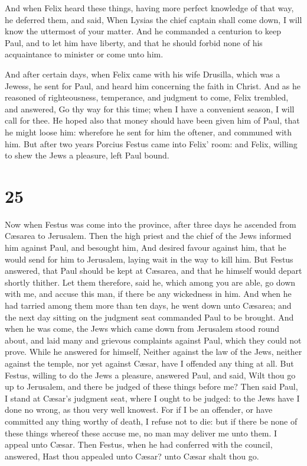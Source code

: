  And when Felix heard these things, having more perfect
knowledge of that way, he deferred them, and said, When Lysias the chief
captain shall come down, I will know the uttermost of your matter.
 And he commanded a centurion to keep Paul, and to let
him have liberty, and that he should forbid none of his acquaintance to
minister or come unto him.

 And after certain days, when Felix came with his wife
Drusilla, which was a Jewess, he sent for Paul, and heard him concerning
the faith in Christ.  And as he reasoned of
righteousness, temperance, and judgment to come, Felix trembled, and
answered, Go thy way for this time; when I have a convenient season, I
will call for thee.  He hoped also that money should have
been given him of Paul, that he might loose him: wherefore he sent for
him the oftener, and communed with him.  But after two
years Porcius Festus came into Felix' room: and Felix, willing to shew
the Jews a pleasure, left Paul bound.

\hypertarget{section-24}{%
\section{25}\label{section-24}}

 Now when Festus was come into the province, after three
days he ascended from Cæsarea to Jerusalem.  Then the high
priest and the chief of the Jews informed him against Paul, and besought
him,  And desired favour against him, that he would send
for him to Jerusalem, laying wait in the way to kill him. 
But Festus answered, that Paul should be kept at Cæsarea, and that he
himself would depart shortly thither.  Let them therefore,
said he, which among you are able, go down with me, and accuse this man,
if there be any wickedness in him.  And when he had
tarried among them more than ten days, he went down unto Cæsarea; and
the next day sitting on the judgment seat commanded Paul to be brought.
 And when he was come, the Jews which came down from
Jerusalem stood round about, and laid many and grievous complaints
against Paul, which they could not prove.  While he
answered for himself, Neither against the law of the Jews, neither
against the temple, nor yet against Cæsar, have I offended any thing at
all.  But Festus, willing to do the Jews a pleasure,
answered Paul, and said, Wilt thou go up to Jerusalem, and there be
judged of these things before me?  Then said Paul, I
stand at Cæsar's judgment seat, where I ought to be judged: to the Jews
have I done no wrong, as thou very well knowest.  For if
I be an offender, or have committed any thing worthy of death, I refuse
not to die: but if there be none of these things whereof these accuse
me, no man may deliver me unto them. I appeal unto Cæsar.
 Then Festus, when he had conferred with the council,
answered, Hast thou appealed unto Cæsar? unto Cæsar shalt thou go.

